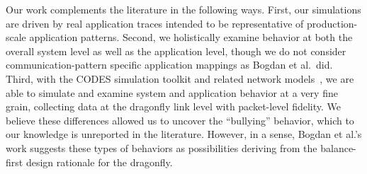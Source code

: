 Our work complements the literature in the following ways. First, our simulations are driven by real application traces intended to be representative of production-scale application patterns. Second, we holistically examine behavior at both the overall system level as well as the application level, though we do not consider communication-pattern specific application mappings as Bogdan et al.\ did. Third, with the CODES simulation toolkit and related network models~\cite{codes, codes-dragonfly},  
we are able to simulate and examine system and application behavior at a very fine grain, collecting data at the dragonfly link level with packet-level fidelity. We believe these differences allowed us to uncover the ``bullying'' behavior, which to our knowledge is unreported in the literature. However, in a sense, Bogdan et al.'s work suggests these types of behaviors as possibilities deriving from the balance-first design rationale for the dragonfly.

